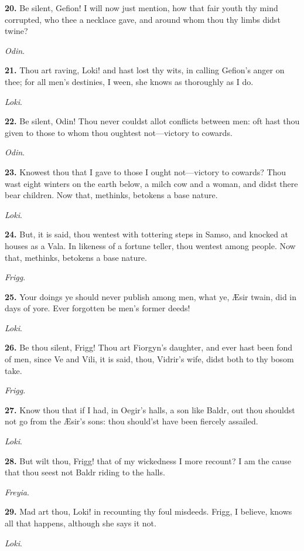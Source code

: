 \textbf{20.} Be silent, Gefion! I will now just mention, how that fair youth
thy mind corrupted, who thee a necklace gave, and around whom thou thy
limbs didst twine?

\emph{Odin}.

\textbf{21.} Thou art raving, Loki! and hast lost thy wits, in calling
Gefion's anger on thee; for all men's destinies, I ween, she knows as
thoroughly as I do.

\emph{Loki}.

\textbf{22.} Be silent, Odin! Thou never couldst allot conflicts between men:
oft hast thou given to those to whom thou oughtest not—victory to
cowards.

\emph{Odin}.

\textbf{23.} Knowest thou that I gave to those I ought not—victory to
cowards? Thou wast eight winters on the earth below, a milch cow and a
woman, and didst there bear children. Now that, methinks, betokens a
base nature.

\emph{Loki}.

\textbf{24.} But, it is said, thou wentest with tottering steps in Samso, and
knocked at houses as a Vala. In likeness of a fortune teller, thou
wentest among people. Now that, methinks, betokens a base nature.

\emph{Frigg}.

\textbf{25.} Your doings ye should never publish among men, what ye, Æsir
twain, did in days of yore. Ever forgotten be men's former deeds!

\emph{Loki}.

\textbf{26.} Be thou silent, Frigg! Thou art Fiorgyn's daughter, and ever
hast been fond of men, since Ve and Vili, it is said, thou, Vidrir's
wife, didst both to thy bosom take.

\emph{Frigg}.

\textbf{27.} Know thou that if I had, in Oegir's halls, a son like Baldr, out
thou shouldst not go from the Æsir's sons: thou should'st have been
fiercely assailed.

\emph{Loki}.

\textbf{28.} But wilt thou, Frigg! that of my wickedness I more recount? I am
the cause that thou seest not Baldr riding to the halls.

\emph{Freyia}.

\textbf{29.} Mad art thou, Loki! in recounting thy foul misdeeds. Frigg, I
believe, knows all that happens, although she says it not.

\emph{Loki}.

